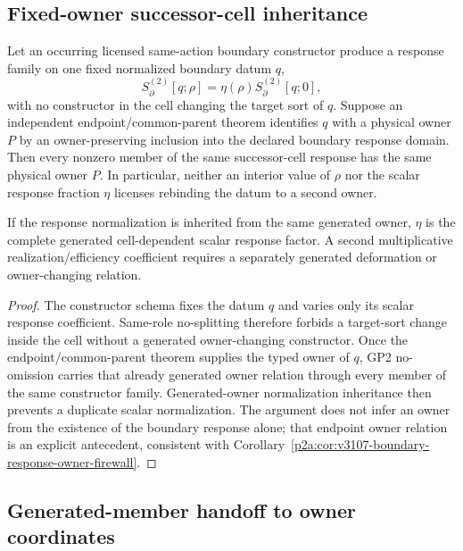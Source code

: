 \documentclass[12pt,a4paper]{article}
\begin{document}
\subsection{Fixed-owner successor-cell inheritance}
\label{p2a:sec:v3108-fixed-owner-successor-cell}

\begin{corollary}
\label{p2a:cor:v3108-fixed-owner-successor-cell}
Let an occurring licensed same-action boundary constructor produce a response
family on one fixed normalized boundary datum $q$,
\[
 S_\partial^{(2)}[q;\rho]
 =\eta(\rho)S_\partial^{(2)}[q;0],
\]
with no constructor in the cell changing the target sort of $q$.  Suppose an
independent endpoint/common-parent theorem identifies $q$ with a physical
owner $P$ by an owner-preserving inclusion into the declared boundary response
domain.  Then every nonzero member of the same successor-cell response has the
same physical owner $P$.  In particular, neither an interior value of $\rho$
nor the scalar response fraction $\eta$ licenses rebinding the datum to a
second owner.

If the response normalization is inherited from the same generated owner,
$\eta$ is the complete generated cell-dependent scalar response factor.  A
second multiplicative realization/efficiency coefficient requires a separately
generated deformation or owner-changing relation.
\end{corollary}

\begin{proof}
The constructor schema fixes the datum $q$ and varies only its scalar response
coefficient.  Same-role no-splitting therefore forbids a target-sort change
inside the cell without a generated owner-changing constructor.  Once the
endpoint/common-parent theorem supplies the typed owner of $q$, GP2
no-omission carries that already generated owner relation through every member
of the same constructor family.  Generated-owner normalization inheritance
then prevents a duplicate scalar normalization.  The argument does not infer
an owner from the existence of the boundary response alone; that endpoint
owner relation is an explicit antecedent, consistent with
Corollary~\ref{p2a:cor:v3107-boundary-response-owner-firewall}.
\end{proof}

\subsection{Generated-member handoff to owner coordinates}
\label{p2a:sec:v3109-generated-member-owner-handoff}
\end{document}
